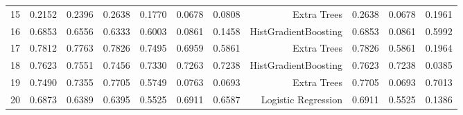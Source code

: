 \begin{landscape}
\begin{table}[htbp]
{\begin{tabular}{lrrrrrrrrrr}
15 & 0.2152 & 0.2396 & 0.2638 & 0.1770 & 0.0678 & 0.0808 & Extra Trees & 0.2638 & 0.0678 & 0.1961 \\
16 & 0.6853 & 0.6556 & 0.6333 & 0.6003 & 0.0861 & 0.1458 & HistGradientBoosting & 0.6853 & 0.0861 & 0.5992 \\
17 & 0.7812 & 0.7763 & 0.7826 & 0.7495 & 0.6959 & 0.5861 & Extra Trees & 0.7826 & 0.5861 & 0.1964 \\
18 & 0.7623 & 0.7551 & 0.7456 & 0.7330 & 0.7263 & 0.7238 & HistGradientBoosting & 0.7623 & 0.7238 & 0.0385 \\
19 & 0.7490 & 0.7355 & 0.7705 & 0.5749 & 0.0763 & 0.0693 & Extra Trees & 0.7705 & 0.0693 & 0.7013 \\
20 & 0.6873 & 0.6389 & 0.6395 & 0.5525 & 0.6911 & 0.6587 & Logistic Regression & 0.6911 & 0.5525 & 0.1386 \\
\bottomrule
\end{tabular}%
}
\end{table}
\end{landscape}
